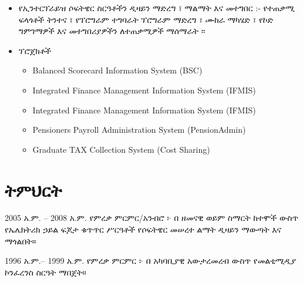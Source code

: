 \documentclass{resume}
\begin{document}

\vspace{0.4ex}

\begin{itemize}
  \item የኢንተርፕራይዝ ሶፍትዌር ስርዓቶችን ዲዛይን ማድረግ ፣ ማልማት እና መተግበር :- የተጠቃሚ ፍላጎቶች ትንተና ፣
የፕሮግራም ተግባራት ፕሮግራም ማድረግ ፣ ሙከራ ማካሄድ ፣ የኮድ ግምገማዎች እና መተግበሪያዎችን ለተጠቃሚዎች ማሰማራት ፡፡

  \item ፕሮጀክቶች

  \begin{itemize}
  \item Balanced Scorecard Information System (BSC)

  \item Integrated Finance Management Information System (IFMIS)

  \item Integrated Finance Management Information System (IFMIS)

  \item Pensioners Payroll Administration System (PensionAdmin)

  \item Graduate TAX Collection System (Cost Sharing)

\end{itemize}

\end{itemize}



\section{ትምህርት}
 {2005 አ.ም. -- 2008 አ.ም.}
የምረቃ ምርምር/አንብሮ ፦ በ ዘመናዊ ወይም ስማርት ከተሞች ውስጥ የኤሌክትሪክ ኃይል ፍጆታ ቁጥጥር ሥርዓቶች የሶፍትዌር መሠረተ ልማት ዲዛይን ማውጣት እና ማጎልበት።

 {1996 አ.ም.-- 1999 አ.ም.}
የምረቃ ምርምር ፦ በ አካባቢያዊ አውታረመረብ ውስጥ የመልቲሚዲያ ኮንፈረንስ ስርዓት ማበጀት።  

\end{document}
